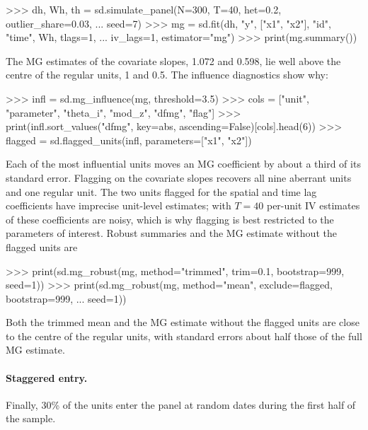 \documentclass[article]{jss}
\begin{document}
\begin{CodeInput}
>>> dh, Wh, th = sd.simulate_panel(N=300, T=40, het=0.2, outlier_share=0.03,
...                                seed=7)
>>> mg = sd.fit(dh, "y", ["x1", "x2"], "id", "time", Wh, tlags=1,
...             iv_lags=1, estimator="mg")
>>> print(mg.summary())
\end{CodeInput}

The MG estimates of the covariate slopes, 1.072 and 0.598, lie well above
the centre of the regular units, 1 and 0.5. The influence diagnostics show
why:

\begin{CodeInput}
>>> infl = sd.mg_influence(mg, threshold=3.5)
>>> cols = ["unit", "parameter", "theta_i", "mod_z", "dfmg", "flag"]
>>> print(infl.sort_values("dfmg", key=abs, ascending=False)[cols].head(6))
>>> flagged = sd.flagged_units(infl, parameters=["x1", "x2"])
\end{CodeInput}

Each of the most influential units moves an MG coefficient by about a third
of its standard error. Flagging on the covariate slopes recovers all nine
aberrant units and one regular unit. The two units flagged for the spatial
and time lag coefficients have imprecise unit-level estimates; with $T=40$
per-unit IV estimates of these coefficients are noisy, which is why
flagging is best restricted to the parameters of interest. Robust summaries
and the MG estimate without the flagged units are

\begin{CodeInput}
>>> print(sd.mg_robust(mg, method="trimmed", trim=0.1, bootstrap=999, seed=1))
>>> print(sd.mg_robust(mg, method="mean", exclude=flagged, bootstrap=999,
...                    seed=1))
\end{CodeInput}

Both the trimmed mean and the MG estimate without the flagged units are close
to the centre of the regular units, with standard errors about half those of
the full MG estimate.

\paragraph{Staggered entry.} Finally, 30\% of the units enter the panel
at random dates during the first half of the sample.
\end{document}
